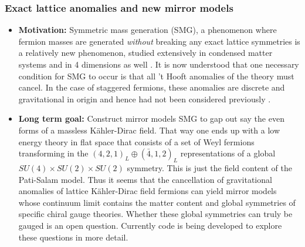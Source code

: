\documentclass[12pt,hyperpdf]{article}
\begin{document}
\subsubsection{Exact lattice anomalies and new mirror models}

\begin{itemize}
   \item{ \bf Motivation:} Symmetric mass generation (SMG), a phenomenon where fermion masses are generated  {\it without} breaking any exact lattice
symmetries is a relatively new phenomenon, studied extensively in condensed matter systems and in 4 dimensions as well \cite{Butt:2021koj,Hasenfratz:2022qan}. It is
now understood that one necessary condition for SMG to occur is that all 
't Hooft anomalies of the theory must cancel. In the case of
staggered fermions, these anomalies are discrete and gravitational in origin and hence
had not been considered previously \cite{Catterall:2022jky}. 
   \item { \bf Long term goal:} Construct mirror models  SMG to gap
out say the even forms of a massless K\"{a}hler-Dirac field. That way one ends up with a low energy
theory in flat space that
consists 
of a set of Weyl fermions transforming in the
$(4,2,1)_L\oplus(\bar 4, 1,2)_L$  representations of a global $SU(4)\times SU(2)\times SU(2)$ symmetry. This is just the field content of the Pati-Salam model. Thus it seems that the cancellation of gravitational
anomalies of lattice K\"{a}hler-Dirac field fermions can yield mirror models whose 
continuum limit contains the matter content and global symmetries
of specific chiral gauge theories. Whether these global
symmetries can truly be gauged is an open question. 
Currently code is being developed to explore these questions 
in more detail.
\end{itemize}
\end{document}
